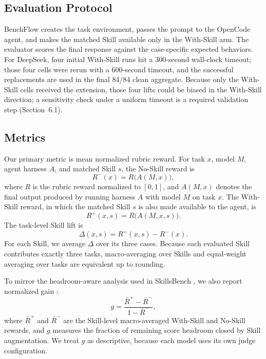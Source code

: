 \documentclass[10pt]{article}
\begin{document}
\subsection{Evaluation Protocol}

BenchFlow creates the task environment, passes the prompt to the OpenCode agent, and makes the matched Skill available only in the With-Skill arm. The evaluator scores the final response against the case-specific expected behaviors. For DeepSeek, four initial With-Skill runs hit a 300-second wall-clock timeout; those four cells were rerun with a 600-second timeout, and the successful replacements are used in the final 84/84 clean aggregate. Because only the With-Skill cells received the extension, those four lifts could be biased in the With-Skill direction; a sensitivity check under a uniform timeout is a required validation step (Section~6.1).

\subsection{Metrics}

Our primary metric is mean normalized rubric reward. For task $x$, model $M$, agent harness $A$, and matched Skill $s$, the No-Skill reward is
\begin{equation}
R^{-}(x) = R\bigl(A(M, x)\bigr),
\label{eq:reward}
\end{equation}
where $R$ is the rubric reward normalized to $[0, 1]$, and $A(M, x)$ denotes the final output produced by running harness $A$ with model $M$ on task $x$. The With-Skill reward, in which the matched Skill $s$ is also made available to the agent, is
\begin{equation}
R^{+}(x, s) = R\bigl(A(M, x, s)\bigr).
\label{eq:rewardwith}
\end{equation}
The task-level Skill lift is
\begin{equation}
\Delta(x, s) = R^{+}(x, s) - R^{-}(x).
\label{eq:lift}
\end{equation}
For each Skill, we average $\Delta$ over its three cases. Because each evaluated Skill contributes exactly three tasks, macro-averaging over Skills and equal-weight averaging over tasks are equivalent up to rounding.

To mirror the headroom-aware analysis used in SkillsBench \cite{skillsbench}, we also report normalized gain \cite{hake}:
\begin{equation}
g = \frac{\bar{R}^{+} - \bar{R}^{-}}{1 - \bar{R}^{-}},
\label{eq:gain}
\end{equation}
where $\bar{R}^{+}$ and $\bar{R}^{-}$ are the Skill-level macro-averaged With-Skill and No-Skill rewards, and $g$ measures the fraction of remaining score headroom closed by Skill augmentation. We treat $g$ as descriptive, because each model uses its own judge configuration.
\end{document}
